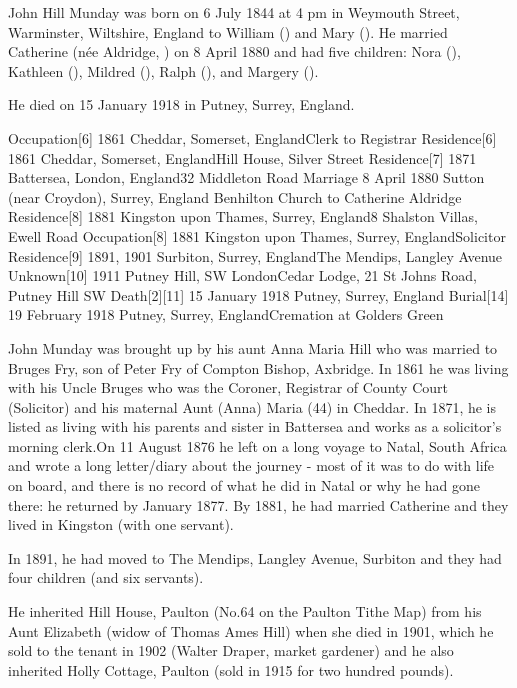 
John Hill Munday was born on 6 July 1844 at 4 pm in Weymouth Street, Warminster, Wiltshire, England\cite{JHMtree, Census1861, JMHbirth}
to William () and Mary ().
He married Catherine (n\'{e}e Aldridge, ) on 8 April 1880 and had five children:
Nora (),
Kathleen (),
Mildred (),
Ralph (), and
Margery ().

He died on 15 January 1918 in Putney, Surrey, England.

Occupation[6] 	1861 	Cheddar, Somerset, EnglandClerk to Registrar
Residence[6] 	1861 	Cheddar, Somerset, EnglandHill House, Silver Street
Residence[7] 	1871 	Battersea, London, England32 Middleton Road
Marriage 	8 April 1880 	Sutton (near Croydon), Surrey, England Benhilton Church to Catherine Aldridge
Residence[8] 	1881 	Kingston upon Thames, Surrey, England8 Shalston Villas, Ewell Road
Occupation[8] 	1881 	Kingston upon Thames, Surrey, EnglandSolicitor
Residence[9] 	1891, 1901 	Surbiton, Surrey, EnglandThe Mendips, Langley Avenue
Unknown[10] 	1911 	Putney Hill, SW LondonCedar Lodge, 21 St Johns Road, Putney Hill SW
Death[2][11] 	15 January 1918 	Putney, Surrey, England
Burial[14] 	19 February 1918 	Putney, Surrey, EnglandCremation at Golders Green

John Munday was brought up by his aunt Anna Maria Hill who was married to Bruges Fry, son of Peter Fry of Compton Bishop, Axbridge. In 1861 he was living with his Uncle Bruges who was the Coroner, Registrar of County Court (Solicitor) and his maternal Aunt (Anna) Maria (44) in Cheddar. In 1871, he is listed as living with his parents and sister in Battersea and works as a solicitor's morning clerk.On 11 August 1876 he left on a long voyage to Natal, South Africa and wrote a long letter/diary about the journey - most of it was to do with life on board, and there is no record of what he did in Natal or why he had gone there: he returned by January 1877. By 1881, he had married Catherine and they lived in Kingston (with one servant).

In 1891, he had moved to The Mendips, Langley Avenue, Surbiton and they had four children (and six servants). 

He inherited Hill House, Paulton (No.64 on the Paulton Tithe Map) from his Aunt Elizabeth (widow of Thomas Ames Hill) when she died in 1901, which he sold to the tenant in 1902 (Walter Draper, market gardener) and he also inherited Holly Cottage, Paulton (sold in 1915 for two hundred pounds).

